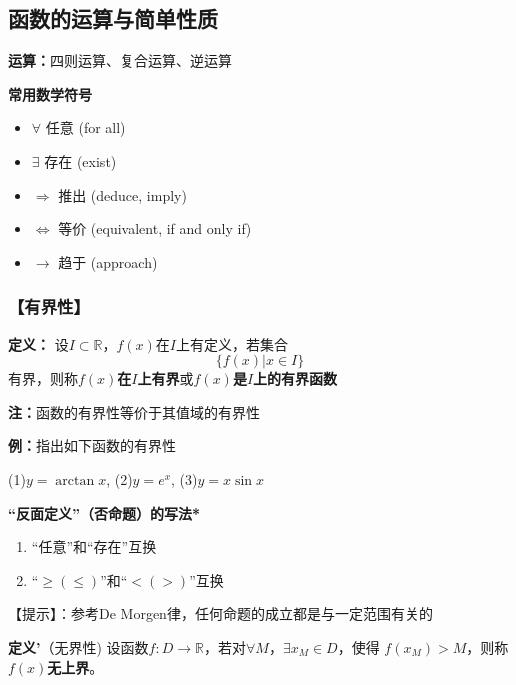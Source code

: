 \subsection{函数的运算与简单性质}

{\bf 运算：}四则运算、复合运算、逆运算	
	
\begin{shaded}
{\bf 常用数学符号}
	\begin{itemize}
	  \item {$\bm{\forall}$} \quad 任意 (for all)
	  \item {$\bm{\exists}$} \quad 存在 (exist)
	  \item {$\bm{\Rightarrow}$} \quad 推出 (deduce, imply)
	  \item {$\bm{\Leftrightarrow}$} \quad 等价 (equivalent, if and only if)
	  \item {$\bm{\to}$} \quad 趋于 (approach)
	\end{itemize}
\end{shaded}

\subsubsection{【有界性】}			

{{\bf 定义：}}
	设$I\subset\mathbb{R}$，$f(x)$在$I$上有定义，若集合
	$$\{f(x)|x\in I\}$$
	有界，则称{\bf $f(x)$在$I$上有界}或{\bf $f(x)$是$I$上的有界函数}
		
	{\bf 注：}函数的有界性等价于其值域的有界性

	{{\bf 例：}指出如下函数的有界性}
	
		\quad(1)\;$y=\arctan x$,\hspace{2em} (2)\;$y=e^x$,\hspace{2em}
		(3)\;$y=x\sin x$
		
\begin{shaded}
	{\bf “反面定义”（否命题）的写法*}
	\begin{enumerate}
	  \item {“任意”和“存在”互换}
	  \item {“$\geq(\leq)$”和“$<(>)$”互换}
	\end{enumerate}
	
	【提示】：参考De Morgen律，任何命题的成立都是与一定范围有关的
	
	{\bf 定义'}（无界性)
		设函数$f:D\to\mathbb{R}$，若对$\forall M$，$\exists x_M\in D$，使得
		$f(x_M)>M$，则称{\bf $f(x)$无上界}。

\end{shaded}		

